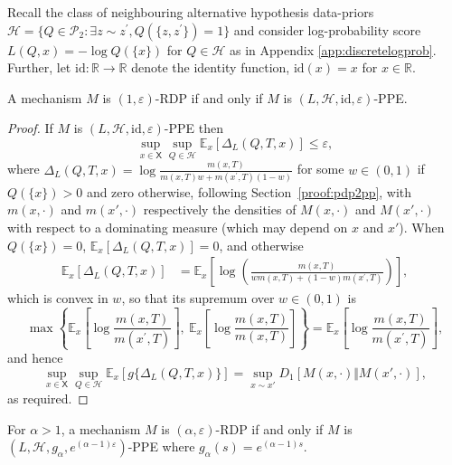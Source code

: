 \documentclass{article}
\theoremstyle{plain}
\theoremstyle{plain}
\theoremstyle{definition}
\theoremstyle{remark}
\theoremstyle{plain}
\newcommand{\ExMx}{\mathbb{E}_{x}}
\newcommand{\xset}{\mathsf{X}}
\renewcommand{\epsilon}{\varepsilon}
\begin{document}
Recall the class of neighbouring alternative hypothesis data-priors $\mathcal H = \{ Q \in \mathcal P_2: \exists z\sim z^\prime, Q(\{ z , z^\prime \})= 1 \}$ and consider log-probability score $L(Q,x) = - \log Q(\{x\})$ for $Q \in \mathcal H$ as in Appendix \ref{app:discretelogprob}. Further, let $\mathrm{id}:\mathbb{R} \rightarrow \mathbb{R}$ denote the identity function, $\mathrm{id}(x)=x$ for $x \in \mathbb{R}$.
\begin{proposition}\label{prop:rdp2ppe1}
     A mechanism $M$ is $(1,\epsilon)$-RDP if and only if $M$ is $(L,\mathcal{H},\mathrm{id},\epsilon)$-PPE. 
 \end{proposition}
\begin{proof}
If $M$ is $(L,\mathcal{H},\mathrm{id},\epsilon)$-PPE then 
    \begin{equation*}
        \sup_{x \in \xset}\sup_{Q \in \mathcal H}\ExMx\left[\Delta_L(Q,T,x)\right] \leq \epsilon,
    \end{equation*}
where $\Delta_L(Q,T,x) = \log\frac{m(x,T)}{m(x,T)w + m(x^\prime, T)(1-w)}$ for some $w \in (0,1)$ if $Q(\{x\}) > 0$ and zero otherwise, following Section~\ref{proof:pdp2pp}, with $m(x,\cdot)$ and $m(x',\cdot)$ respectively the densities of $M(x,\cdot)$ and $M(x', \cdot)$ with respect to a dominating measure (which may depend on $x$ and $x'$). When $Q(\{x\}) = 0$, $\ExMx [\Delta_L(Q,T,x)] = 0$, and otherwise 
\begin{align*}
    \ExMx [\Delta_L(Q,T,x)]
    &= \ExMx \left[ \log \left(\frac{ m(x,T) }{ w m(x,T) + (1-w)m(x^\prime,T) }\right) \right],
\end{align*}
which is convex in $w$, so that its supremum over $w \in (0,1)$ is 
\begin{equation*}
    \max \left\{ \ExMx \left[ \log \frac{ m(x,T) }{m(x^\prime,T) } \right],\ \ExMx \left[ \log \frac{ m(x,T) }{  m(x,T)  } \right]\right\}=\ExMx \left[ \log \frac{ m(x,T) }{m(x^\prime,T) } \right],
\end{equation*}
and hence 
\begin{equation*}
\sup_{x \in \xset}\sup_{Q \in \mathcal H}\ExMx\left[g\{\Delta_L(Q,T,x)\}\right]  = \sup_{x \sim x'} D_1[M(x,\cdot ) \Vert M(x',\cdot) ],
\end{equation*}
as required.
\end{proof}
\begin{proposition}\label{prop:rdp2ppe}
    For $\alpha > 1$, a mechanism $M$ is $(\alpha,\epsilon)$-RDP if and only if $M$ is $(L,\mathcal{H},g_\alpha,e^{(\alpha-1)\epsilon})$-PPE where $g_\alpha(s) = e^{(\alpha-1)s}$.
\end{proposition}
\end{document}
